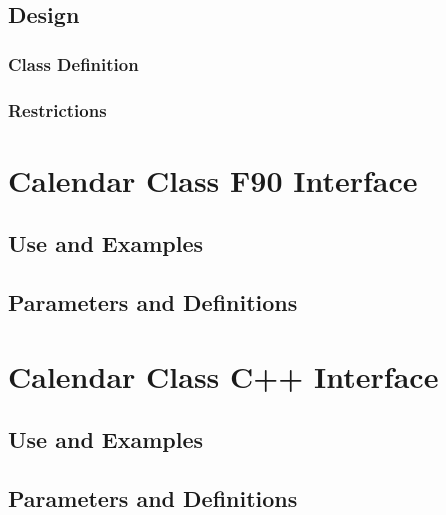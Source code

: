 \documentclass[]{article}
\begin{document}
\subsection{Design}


\subsubsection{Class Definition}


\subsubsection{Restrictions}


\section{Calendar Class F90 Interface}

\subsection{Use and Examples}


\subsection{Parameters and Definitions}




\section{Calendar Class C++ Interface}

\subsection{Use and Examples}
%

\subsection{Parameters and Definitions}



\end{document}
